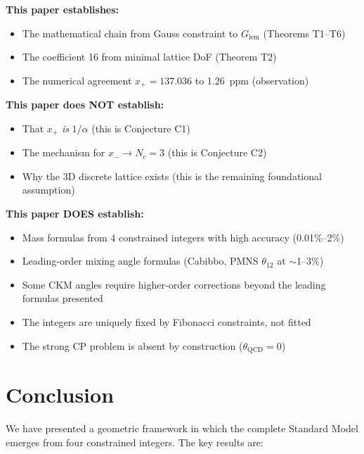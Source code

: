 \documentclass[11pt,a4paper]{article}
\theoremstyle{definition}
\theoremstyle{remark}
\newcommand{\Glem}{G_{\text{lem}}}
\begin{document}
\textbf{This paper establishes:}
\begin{itemize}
    \item The mathematical chain from Gauss constraint to $\Glem$ (Theorems T1--T6)
    \item The coefficient 16 from minimal lattice DoF (Theorem T2)
    \item The numerical agreement $x_+ = 137.036$ to 1.26~ppm (observation)
\end{itemize}

\textbf{This paper does NOT establish:}
\begin{itemize}
    \item That $x_+$ \emph{is} $1/\alpha$ (this is Conjecture C1)
    \item The mechanism for $x_- \to N_c = 3$ (this is Conjecture C2)
    \item Why the 3D discrete lattice exists (this is the remaining foundational assumption)
\end{itemize}

\textbf{This paper DOES establish:}
\begin{itemize}
    \item Mass formulas from 4 constrained integers with high accuracy (0.01\%--2\%)
    \item Leading-order mixing angle formulas (Cabibbo, PMNS $\theta_{12}$ at $\sim$1--3\%)
    \item Some CKM angles require higher-order corrections beyond the leading formulas presented
    \item The integers are uniquely fixed by Fibonacci constraints, not fitted
    \item The strong CP problem is absent by construction ($\theta_{\text{QCD}} = 0$)
\end{itemize}

\section{Conclusion}

We have presented a geometric framework in which the complete Standard Model emerges from four constrained integers. The key results are:
\end{document}
